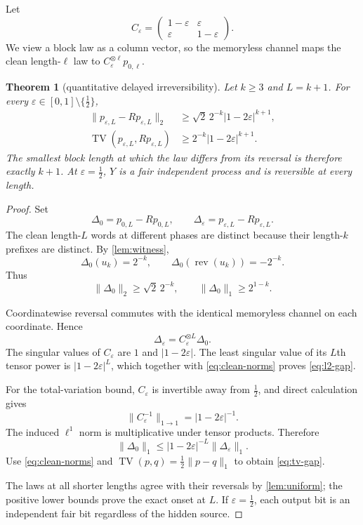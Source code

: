 \documentclass[11pt,a4paper]{amsart}
\newtheorem{theorem}{Theorem}[section]
\theoremstyle{definition}
\theoremstyle{remark}
\newcommand{\rev}{\operatorname{rev}}
\newcommand{\TV}{\operatorname{TV}}
\begin{document}
Let
\[
 C_\varepsilon=
 \begin{pmatrix}
 1-\varepsilon&\varepsilon\\
 \varepsilon&1-\varepsilon
 \end{pmatrix}.
\]
We view a block law as a column vector, so the memoryless channel maps the
clean length-$\ell$ law to $C_\varepsilon^{\otimes\ell}p_{0,\ell}$.

\begin{theorem}[quantitative delayed irreversibility]\label{thm:gap}
Let $k\geq3$ and $L=k+1$.  For every
$\varepsilon\in[0,1]\setminus\{\tfrac12\}$,
\begin{align}
 \bigl\|p_{\varepsilon,L}-Rp_{\varepsilon,L}\bigr\|_2
 &\geq
 \sqrt{2}\,2^{-k}|1-2\varepsilon|^{k+1},
 \label{eq:l2-gap}\\
 \TV\!\left(p_{\varepsilon,L},Rp_{\varepsilon,L}\right)
 &\geq
 2^{-k}|1-2\varepsilon|^{k+1}.
 \label{eq:tv-gap}
\end{align}
The smallest block length at which the law differs from its reversal is
therefore exactly $k+1$.  At $\varepsilon=\tfrac12$, $Y$ is a fair
independent process and is reversible at every length.
\end{theorem}

\begin{proof}
Set
\[
 \Delta_0=p_{0,L}-Rp_{0,L},
 \qquad
 \Delta_\varepsilon=p_{\varepsilon,L}-Rp_{\varepsilon,L}.
\]
The clean length-$L$ words at different phases are distinct because their
length-$k$ prefixes are distinct.  By \cref{lem:witness},
\[
 \Delta_0(u_k)=2^{-k},
 \qquad
 \Delta_0(\rev(u_k))=-2^{-k}.
\]
Thus
\begin{equation}\label{eq:clean-norms}
 \|\Delta_0\|_2\geq\sqrt{2}\,2^{-k},
 \qquad
 \|\Delta_0\|_1\geq2^{1-k}.
\end{equation}

Coordinatewise reversal commutes with the identical memoryless channel on
each coordinate.  Hence
\[
 \Delta_\varepsilon=C_\varepsilon^{\otimes L}\Delta_0.
\]
The singular values of $C_\varepsilon$ are $1$ and
$|1-2\varepsilon|$.  The least singular value of its $L$th tensor power is
$|1-2\varepsilon|^L$, which together with \eqref{eq:clean-norms} proves
\eqref{eq:l2-gap}.

For the total-variation bound, $C_\varepsilon$ is invertible away from
$\tfrac12$, and direct calculation gives
\[
 \|C_\varepsilon^{-1}\|_{1\to1}
 =|1-2\varepsilon|^{-1}.
\]
The induced $\ell^1$ norm is multiplicative under tensor products.  Therefore
\[
 \|\Delta_0\|_1
 \leq |1-2\varepsilon|^{-L}\|\Delta_\varepsilon\|_1.
\]
Use \eqref{eq:clean-norms} and
$\TV(p,q)=\tfrac12\|p-q\|_1$ to obtain \eqref{eq:tv-gap}.

The laws at all shorter lengths agree with their reversals by
\cref{lem:uniform}; the positive lower bounds prove the exact onset at $L$.
If $\varepsilon=\tfrac12$, each output bit is an independent fair bit
regardless of the hidden source.
\end{proof}
\end{document}
